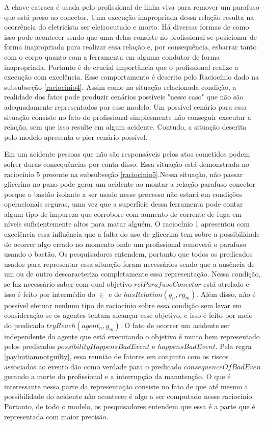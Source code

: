 A chave catraca é usada pelo profissional de linha viva para remover um parafuso que está preso ao conector. Uma execução inapropriada dessa relação resulta 
na ocorrência do eletricista ser eletrocutado e morto. Há diversas formas de como isso pode acontecer sendo que uma delas consiste no profissional se 
posicionar de forma inapropriada para realizar essa relação e, por consequência, esbarrar tanto com o corpo quanto com a ferramenta em alguma condutor 
de forma inapropriada. Portanto é de crucial importância que o profissional realize a execução com excelência. Esse comportamento é descrito pelo 
Raciocínio dado na subsubseção \ref{raciocinio4}. Assim como na situação relacionada condição, a realidade dos fatos pode produzir cenários possíveis "nesse caso" que não são 
adequadamente representados por esse modelo. Um possível cenário para essa situação consiste no fato do profissional simplesmente não conseguir executar 
a relação, sem que isso resulte em algum acidente. Contudo, a situação descrita pelo modelo apresenta o pior cenário possível. 

Em um acidente pessoas que não são responsáveis pelos atos cometidos podem sofrer duras consequências por conta disso. Essa situação está demonstrada no 
raciocínio 5 presente na subsubseção \ref{raciocinio5}.Nessa situação, não passar glicerina no pano pode gerar um acidente ao montar a relação parafuso 
conector porque o bastão isolante a ser usado nesse  processo não estará em condições operacionais seguras, uma vez que a superfície dessa ferramenta pode 
contar algum tipo de impureza que corrobore com aumento de corrente de fuga em níveis suficientemente altos para matar alguém. O raciocínio 1 apresentou
com excelência essa influência que a falta do uso de glicerina tem sobre a possibilidade de ocorrer algo errado no momento onde um profissional 
removerá o parafuso usando o bastão. Os pesquisadores entendem, portanto que todos os predicados usados para representar essa situação foram necessários 
sendo que a ausência de um ou de outro descaracteriza completamente essa representação. Nessa condição, se faz necessário saber com qual objetivo 
$relParafusoConector$ está atrelado e isso é feito por intermédio do $\in$ e de $hasRelation(g_n,rg_m)$. Além disso, não é possível efetuar nenhum 
tipo de raciocínio sobre essa condição sem levar em consideração se os agentes tentam alcançar esse objetivo, e isso é feito por meio do predicado 
$tryReach(agent_n,g_m)$. O fato de ocorrer um acidente ser independente do agente que está executando o objetivo é muito bem representado pelos predicados 
$possibilityHappensBadEvent$ e $happensBadEvent$. Pela regra \ref{paybutiamnotguilty}, essa reunião de fatores em conjunto com os riscos associados 
ao evento dão como verdade para o predicado $consequenceOfBadEven$ gerando a morte do profissional e a interrupção da manutenção. O que é interessante nessa parte da representação consiste no fato de que até mesmo a possibilidade do acidente não acontecer 
é algo a ser computado nesse raciocínio. Portanto, de todo o modelo, os pesquisadores entendem que essa é a parte que é representada com maior precisão. 

